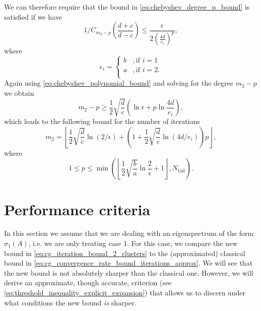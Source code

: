 We can therefore require that the bound in \cref{eq:chebyshev_degree_p_bound} is satisfied if we have
\[
    1/C_{m_2-p}\left(\frac{d+c}{d-c}\right) \leq \frac{\epsilon}{2\left( \frac{4d}{e_i}\right)^p},
\]
where 
\[
    e_i = \begin{cases}
        b &, \text{if } i = 1\\
        a &, \text{if } i = 2.\\
    \end{cases}
\]
Again using \cref{eq:chebyshev_polynomial_bound} and solving for the degree $m_2 - p$ we obtain
\[
    m_2 - p \geq \frac{1}{2}\sqrt{\frac{d}{c}}\left(\ln{\epsilon} + p \ln{\frac{4d}{e_i}}\right),
\]
which leads to the following bound for the number of iterations \cite[Equation 4.4]{cg_sharpened_convrate_Axelsson1976}
\begin{equation}
    m_2=\left\lfloor\frac{1}{2} \sqrt{\frac{d}{c}} \ln (2 / \epsilon)+\left(1+\frac{1}{2} \sqrt{\frac{d}{c}} \ln (4 d / e_i)\right) p\right\rfloor,
    \label{eq:cg_iteration_bound_2_clusters}
\end{equation}
where 
\[
    1 \leq p \leq \min\left(\left\lfloor\frac{1}{2}\sqrt{\frac{b}{a}}\ln{\frac{2}{\epsilon}} + 1 \right\rfloor, N_{\text{tail}}\right).
\]

\section{Performance criteria}\label{sec:cg_two_cluster_performance_criteria}
In this section we assume that we are dealing with an eigenspectrum of the form $\sigma_1(A)$, i.e. we are only treating case 1. For this case, we compare the new bound in \cref{eq:cg_iteration_bound_2_clusters} to the (approximated) classical bound in \cref{eq:cg_convergence_rate_bound_iterations_approx}. We will see that the new bound is not absolutely sharper than the classical one. However, we will derive an approximate, though accurate, criterion (see \cref{eq:threshold_inequality_explicit_expansion}) that allows us to discern under what conditions the new bound \textit{is} sharper.


